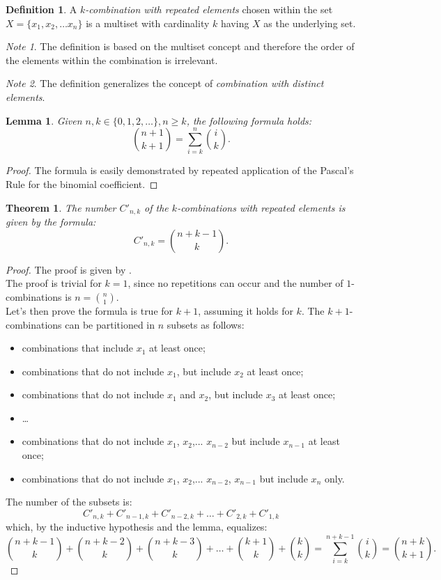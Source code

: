\documentclass[12pt]{article}
\newtheorem{thm}{Theorem}
\newtheorem{lemma}{Lemma}
\theoremstyle{definition}
\newtheorem{defn}{Definition}
\theoremstyle{remark}
\newtheorem{note}{Note}
\begin{document}
\theoremstyle{definition}
\begin{defn}
A \emph{$k$-combination with repeated elements} chosen within the set $X=\{x_1,x_2,\ldots x_n\}$ is a multiset with cardinality $k$ having $X$ as the underlying set.
\end{defn}
\begin{note}
The definition is based on the multiset concept and therefore the order of the elements within the combination is irrelevant.
\end{note}
\begin{note}
The definition generalizes the concept of \emph{combination with distinct elements}.
\end{note}
\begin{lemma}
Given $n,k \in \{0,1,2,\ldots\},n \ge k$, the following formula holds:
$$
\binom{n+1}{k+1}=\sum_{i=k}^n\binom{i}{k}.
$$
\end{lemma}
\begin{proof}
The formula is easily demonstrated by repeated application of the Pascal's Rule for the binomial coefficient.
\end{proof}
\begin{thm}
The number $C'_{n,k}$ of the $k$-combinations with repeated elements is given by the formula:
$$
C'_{n,k}=\binom{n+k-1}{k}.
$$
\end{thm}
\begin{proof}
The proof is given by .\\
The proof is trivial for $k=1$, since no repetitions can occur and the number of $1$-combinations is $n=\binom{n}{1}$.\\
Let's then prove the formula is true for $k+1$, assuming it holds for $k$. The $k+1$-combinations can be partitioned in $n$ subsets as follows:
\begin{itemize}
\item
combinations that include $x_1$ at least once;
\item
combinations that do not include $x_1$, but include $x_2$ at least once;
\item
combinations that do not include $x_1$ and $x_2$, but include $x_3$ at least once;
\item \ldots
\item
combinations that do not include $x_1$, $x_2$,... $x_{n-2}$ but include $x_{n-1}$ at least once;
\item
combinations that do not include $x_1$, $x_2$,... $x_{n-2}$, $x_{n-1}$ but include $x_n$ only.
\end{itemize}
The number of the subsets is:
$$C'_{n,k}+C'_{n-1,k}+C'_{n-2,k}+\ldots +C'_{2,k}+C'_{1,k}$$
which, by the inductive hypothesis and the lemma, equalizes:
$$
\binom{n+k-1}{k}+\binom{n+k-2}{k}+\binom{n+k-3}{k}+\ldots +\binom{k+1}{k}+\binom{k}{k}=\sum_{i=k}^{n+k-1}\binom{i}{k}=\binom{n+k}{k+1}.
$$
\end{proof}
\end{document}
